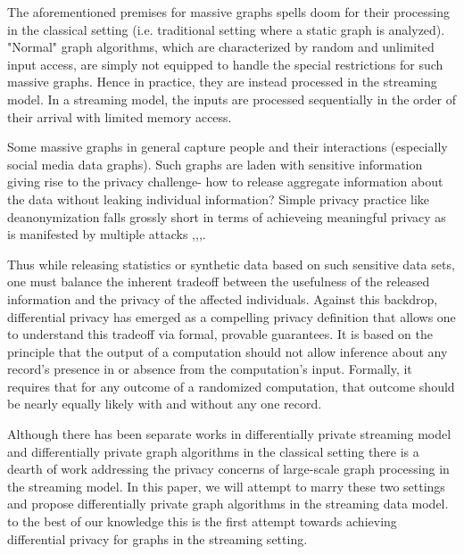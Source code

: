 \documentclass{article}
\theoremstyle{definition}
\begin{document}
 The aforementioned premises for massive graphs spells doom for their processing in the classical setting (i.e. traditional setting where a static graph is analyzed). "Normal" graph algorithms, which are characterized by random  and unlimited input access, are simply not equipped to handle the special restrictions for such massive graphs. Hence in practice, they are instead processed in the streaming model. In a streaming model, the inputs are  processed sequentially in the order of their arrival with limited memory access.   
 \par Some massive graphs in general capture people and their interactions (especially social media data graphs).  Such graphs are laden with sensitive information giving rise to the privacy challenge- how to release aggregate information about the data without leaking individual information? Simple privacy practice like deanonymization falls grossly short in terms of achieveing meaningful privacy  as is  manifested by multiple attacks \cite{1},\cite{2},\cite{3},\cite{4}. 
 
Thus while releasing statistics or synthetic data based on such sensitive data sets, one
must balance the inherent tradeoff between the usefulness of the released information and the privacy
of the affected individuals. Against this backdrop, differential privacy has emerged as a
compelling privacy definition that allows one to understand this tradeoff via formal, provable guarantees. It is based on the principle that the output
of a computation should not allow inference about any
record’s presence in or absence from the computation’s input.
Formally, it requires that for any outcome of a randomized
computation, that outcome should be nearly equally
likely with and without any one record. 
\par Although there has been separate works in differentially private streaming model  and differentially private graph algorithms in the classical setting  there is a dearth of work addressing the privacy concerns of large-scale graph processing in the streaming model. In this paper, we will attempt to marry these two settings and propose differentially private graph algorithms in the streaming data model. to the best of our knowledge this is the first attempt towards achieving differential privacy for graphs in the streaming setting.
\end{document}
